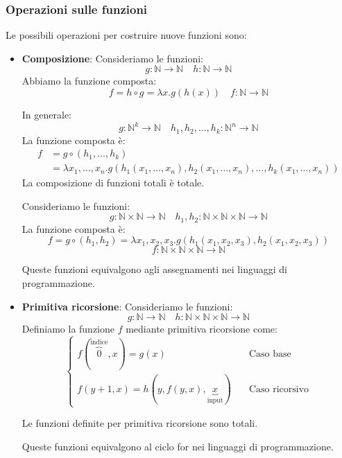 \documentclass[a4paper]{article}
\begin{document}
\subsubsection{Operazioni sulle funzioni}
Le possibili operazioni per costruire nuove funzioni sono:
\begin{itemize}
  \item \textbf{Composizione}: Consideriamo le funzioni:
    \[
      g: \mathbb{N} \to \mathbb{N} \quad
      h: \mathbb{N} \to \mathbb{N}
    \] 
    Abbiamo la funzione composta:
    \[
      f = h \circ g = \lambda x. g(h(x)) \quad f: \mathbb{N} \to \mathbb{N}
    \]

    \vspace{1em}
    \noindent
    In generale:
    \[
      g: \mathbb{N}^k \to \mathbb{N} \quad
      h_1, h_2, \ldots, h_k: \mathbb{N}^n \to \mathbb{N}
    \] 
    La funzione composta è:
    \[
      \begin{aligned}
        f &= g \circ (h_1, \ldots, h_k)\\
          &= \lambda x_1, \ldots, x_n. g(h_1(x_1, \ldots, x_n),
        h_2(x_1, \ldots, x_n), \ldots, h_k(x_1, \ldots, x_n))
      \end{aligned}
    \]
    La composizione di funzioni totali è totale.

    \begin{example}
      Consideriamo le funzioni:
      \[
        g: \mathbb{N}\times \mathbb{N} \to \mathbb{N} \quad
        h_1, h_2: \mathbb{N} \times \mathbb{N} \times \mathbb{N} \to \mathbb{N}
      \] 
      La funzione composta è:
      \[
        f = g \circ (h_1, h_2) = \lambda x_1, x_2, x_3. g(h_1(x_1, x_2, x_3), h_2(x_1, x_2, x_3))
      \] 
      \[
        f: \mathbb{N} \times \mathbb{N} \times \mathbb{N} \to \mathbb{N}
      \] 
    \end{example}
    Queste funzioni equivalgono agli assegnamenti nei linguaggi di programmazione.

  \item \textbf{Primitiva ricorsione}: Consideriamo le funzioni:
    \[
      g: \mathbb{N} \to \mathbb{N} \quad
      h: \mathbb{N} \times \mathbb{N} \times \mathbb{N} \to \mathbb{N}
    \] 
    Definiamo la funzione \( f \) mediante primitiva ricorsione come:
    \[
      \begin{cases}
        f(\overbrace{0}^{\text{indice}}, x) = g(x) \quad &\text{Caso base}\\
        f(y+1, x) = h(y, f(y, x), \underbrace{x}_{\text{input}}) \quad &\text{Caso ricorsivo}
      \end{cases}
    \] 

    Le funzioni definite per primitiva ricorsione sono totali.

    Queste funzioni equivalgono al ciclo for nei linguaggi di programmazione.
\end{itemize}
\end{document}
